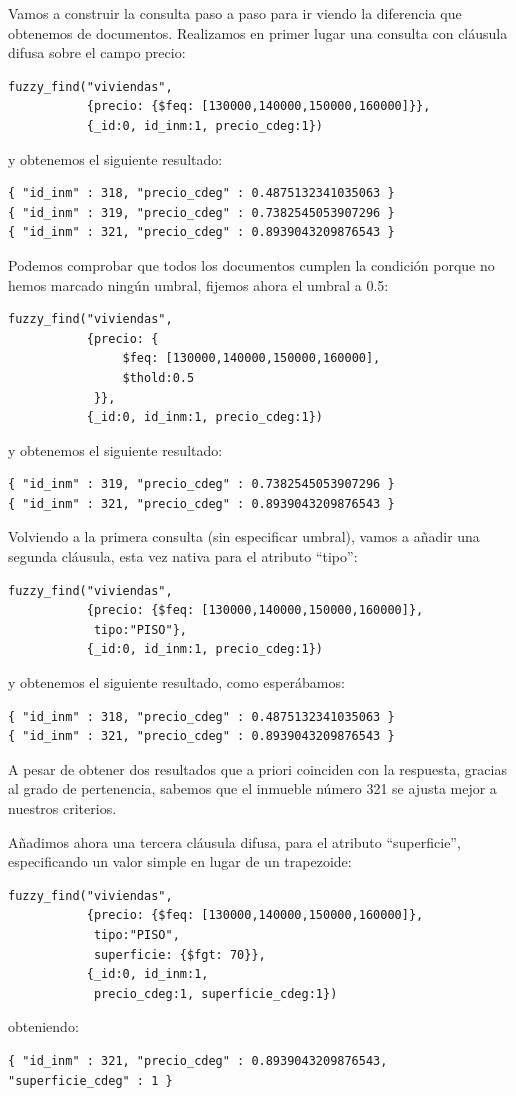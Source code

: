 \begin{example}
Vamos a construir la consulta paso a paso para ir viendo la diferencia que obtenemos de documentos. Realizamos en primer lugar una consulta con cláusula difusa sobre el campo precio:
%
\begin{verbatim}
fuzzy_find("viviendas", 
           {precio: {$feq: [130000,140000,150000,160000]}}, 
           {_id:0, id_inm:1, precio_cdeg:1})
\end{verbatim}
%
y obtenemos el siguiente resultado:
%
\begin{lstlisting}[numbers=none]
{ "id_inm" : 318, "precio_cdeg" : 0.4875132341035063 }
{ "id_inm" : 319, "precio_cdeg" : 0.7382545053907296 }
{ "id_inm" : 321, "precio_cdeg" : 0.8939043209876543 }
\end{lstlisting}
%
Podemos comprobar que todos los documentos cumplen la condición porque no hemos marcado ningún umbral, fijemos ahora el umbral a 0.5:
%
\begin{verbatim}
fuzzy_find("viviendas", 
           {precio: {
                $feq: [130000,140000,150000,160000], 
                $thold:0.5
            }}, 
           {_id:0, id_inm:1, precio_cdeg:1})
\end{verbatim}
%
y obtenemos el siguiente resultado:
%
\begin{lstlisting}[numbers=none]
{ "id_inm" : 319, "precio_cdeg" : 0.7382545053907296 }
{ "id_inm" : 321, "precio_cdeg" : 0.8939043209876543 }
\end{lstlisting}
%
Volviendo a la primera consulta (sin especificar umbral), vamos a añadir una segunda cláusula, esta vez nativa para el atributo ``tipo'':
%
\begin{verbatim}
fuzzy_find("viviendas", 
           {precio: {$feq: [130000,140000,150000,160000]}, 
            tipo:"PISO"}, 
           {_id:0, id_inm:1, precio_cdeg:1})
\end{verbatim}
%
y obtenemos el siguiente resultado, como esperábamos:
%
\begin{lstlisting}[numbers=none]
{ "id_inm" : 318, "precio_cdeg" : 0.4875132341035063 }
{ "id_inm" : 321, "precio_cdeg" : 0.8939043209876543 }
\end{lstlisting}
%
A pesar de obtener dos resultados que a priori coinciden con la respuesta, gracias al grado de pertenencia, sabemos que el inmueble número 321 se ajusta mejor a nuestros criterios. 

Añadimos ahora una tercera cláusula difusa, para el atributo ``superficie'', especificando un valor simple en lugar de un trapezoide:
%
\begin{verbatim}
fuzzy_find("viviendas", 
           {precio: {$feq: [130000,140000,150000,160000]}, 
            tipo:"PISO", 
            superficie: {$fgt: 70}}, 
           {_id:0, id_inm:1, 
            precio_cdeg:1, superficie_cdeg:1})
\end{verbatim}
%
obteniendo:
%
\begin{lstlisting}[numbers=none]
{ "id_inm" : 321, "precio_cdeg" : 0.8939043209876543, "superficie_cdeg" : 1 }
\end{lstlisting}
\end{example}
